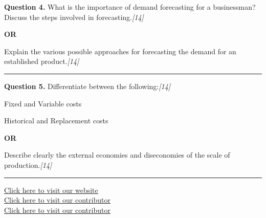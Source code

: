 \documentclass[11pt,a4paper]{article}
\newcommand{\pts}[1]{\hfill   \textit{[#1]}}
\begin{document}
\pagebreak




\noindent   \textbf{Question 4.}
What is the importance of demand forecasting for a businessman? Discuss the steps involved in forecasting.\pts{14}

\centerline{   \textbf{OR}}

Explain the various possible approaches for forecasting the demand for an established product.\pts{14}

\medskip\rule{\linewidth}{0.2pt}




\noindent   \textbf{Question 5.}
Differentiate between the following:\pts{14}

\begin{parts}
  \item Fixed and Variable costs
  \item Historical and Replacement costs
\end{parts}

\centerline{   \textbf{OR}}

Describe clearly the external economies and diseconomies of the scale of production.\pts{14}

\vfill
\rule{\linewidth}{0.4pt}

\begin{center}\small
\href{https://bhu-exam.vercel.app/}{Click here to visit our website}\\[4pt]
\href{https://me-aryan.vercel.app/}{Click here to visit our contributor}\\[4pt]
\href{https://quashan-me.vercel.app/}{Click here to visit our contributor}
\end{center}
\end{document}
